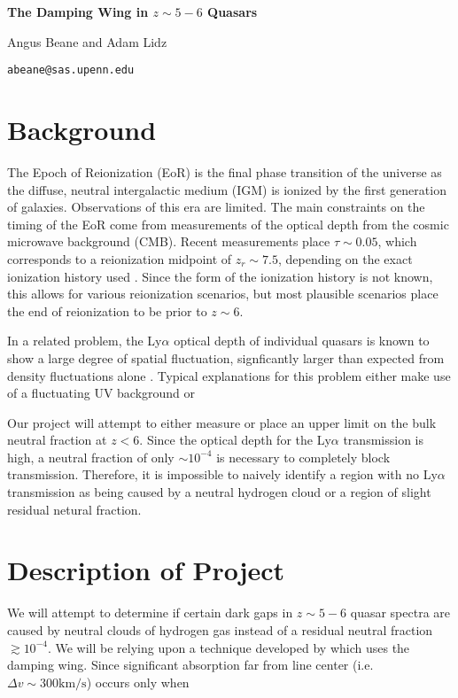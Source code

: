 \documentclass[11pt,letterpaper]{article}
\begin{document}
\thispagestyle{firstpage}%
\ifdefined\dark
    \pagecolor{bggrey}
    \color{white}
\fi

\def\parskipdefault{\parskip}
\setlength{\parskip}{1.2ex}

\def\parindentdefault{\parindent}
\setlength{\parindent}{0pt}

\textbf{The Damping Wing in $z\sim5-6$ Quasars}

Angus Beane and Adam Lidz

\texttt{abeane@sas.upenn.edu}

\deemph{\today}

\section{Background}
The Epoch of Reionization (EoR) is the final phase transition of the universe
as the diffuse, neutral intergalactic medium (IGM) is ionized by the first
generation of galaxies. Observations of this era are limited. The main
constraints on the timing of the EoR come from measurements of the optical
depth from the cosmic microwave background (CMB). Recent measurements place
$\tau \sim 0.05$, which corresponds to a reionization midpoint of $z_r \sim
7.5$, depending on the exact ionization history used
\citep{2018arXiv180706209P}. Since the form of the ionization history is not
known, this allows for various reionization scenarios, but most plausible
scenarios place the end of reionization to be prior to $z\sim6$.

In a related problem, the Ly$\alpha$ optical depth of individual quasars is
known to show a large degree of spatial fluctuation, signficantly larger than
expected from density fluctuations alone \citep[e.g.][]{2015PASA...32...45B}.
Typical explanations for this problem either make use of a fluctuating UV
background \citep{2017MNRAS.465.3429C} or

Our project will attempt to either measure or place an upper limit on the bulk
neutral fraction at $z<6$. Since the optical depth for the Ly$\alpha$
transmission is high, a neutral fraction of only $\sim10^{-4}$ is necessary to
completely block transmission. Therefore, it is impossible to naively identify
a region with no Ly$\alpha$ transmission as being caused by a neutral hydrogen
cloud or a region of slight residual netural fraction.

\section{Description of Project}
We will attempt to determine if certain dark gaps in $z\sim5-6$ quasar spectra
are caused by neutral clouds of hydrogen gas instead of a residual neutral
fraction $\gtrsim 10^{-4}$. We will be relying upon a technique developed by
\citet{2015ApJ...799..179M} which uses the damping wing. Since significant
absorption far from line center (i.e. $\Delta v \sim 300 \text{km}/\text{s}$)
occurs only when 


\end{document}
